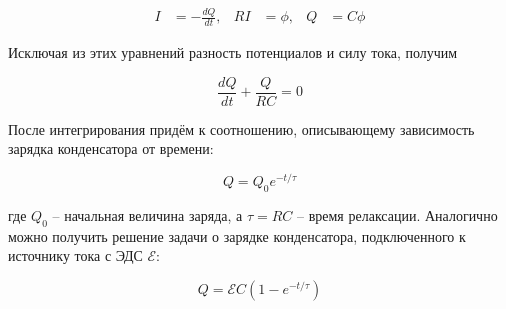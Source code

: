 \begin{align*}
    I &= - \frac{d Q}{d t}, & R I &= \phi, & Q &= C \phi
\end{align*}

\noindent
Исключая из этих уравнений разность потенциалов и силу тока, получим

\begin{equation*}
    \frac{d Q}{d t} + \frac{Q}{R C} = 0
\end{equation*}

\noindent
После интегрирования придём к соотношению, описывающему зависимость зарядка конденсатора от времени:

\begin{equation}
    Q = Q_0 e^{-t / \tau}
\end{equation}

\noindent
где $Q_0$ -- начальная величина заряда, а $\tau = R C$ -- время релаксации. Аналогично можно получить решение задачи о зарядке конденсатора, подключенного к источнику тока с ЭДС $\mathcal{E}$:

\begin{equation}
    Q = \mathcal{E} C \left( 1 - e^{-t / \tau} \right)
\end{equation}